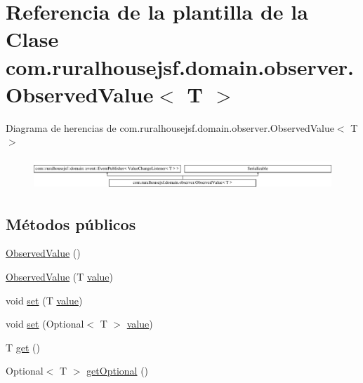 \hypertarget{a00180}{}\section{Referencia de la plantilla de la Clase com.\+ruralhousejsf.\+domain.\+observer.\+Observed\+Value$<$ T $>$}
\label{a00180}
Diagrama de herencias de com.\+ruralhousejsf.\+domain.\+observer.\+Observed\+Value$<$ T $>$\begin{figure}[H]
\begin{center}
\leavevmode
\includegraphics[height=1.181435cm]{a00180}
\end{center}
\end{figure}
\subsection*{Métodos públicos}
\begin{DoxyCompactItemize}
\item 
\mbox{\hyperlink{a00180_a3e9d0c3cf901dfdc6c5d919021d9b8ed}{Observed\+Value}} ()
\item 
\mbox{\hyperlink{a00180_a428dfb79e0d2f9946e9361d8674b070b}{Observed\+Value}} (T \mbox{\hyperlink{a00180_a7f337dfd21158b7642243b5fd1fcb877}{value}})
\item 
void \mbox{\hyperlink{a00180_a7397923ac9ae07a242775665542dee80}{set}} (T \mbox{\hyperlink{a00180_a7f337dfd21158b7642243b5fd1fcb877}{value}})
\item 
void \mbox{\hyperlink{a00180_aaa277755e533e7e85e11640fc98866af}{set}} (Optional$<$ T $>$ \mbox{\hyperlink{a00180_a7f337dfd21158b7642243b5fd1fcb877}{value}})
\item 
T \mbox{\hyperlink{a00180_a6e489c75f998a9668e284a6df19d1184}{get}} ()
\item 
Optional$<$ T $>$ \mbox{\hyperlink{a00180_a907b308692e368ef1021835f556ddc82}{get\+Optional}} ()
\end{DoxyCompactItemize}
